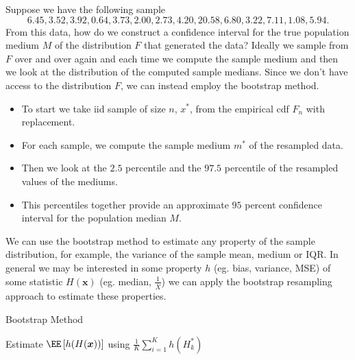 \begin{exam} \label{exam: bootstrap_median}
    Suppose we have the following sample
    \begin{equation*}
        6.45 , 3.52 , 3.92 , 0.64 , 3.73 , 2.00, 2.73 , 4.20, 20.58, 6.80, 3.22, 7.11, 1.08 , 5.94.
    \end{equation*}
    From this data, how do we construct a confidence interval for the true population medium $M$ of the distribution $F$ that generated the data? Ideally we sample from $F$ over and over again and each time we compute the sample medium and then we look at the distribution of the computed sample medians. Since we don't have access to the distribution $F$, we can instead employ the bootstrap method.
    \begin{itemize}
        \item To start we take iid sample of size $n$, $x^{\ast}$, from the empirical cdf $F_n$ with replacement.
        \item For each sample, we compute the sample medium $m^{\ast}$ of the resampled data.
        \item Then we look at the $2.5$ percentile and the $97.5$ percentile of the resampled values of the mediums.
        \item This percentiles together provide an approximate $95$ percent confidence interval for the population median $M$.
    \end{itemize}
\end{exam}

We can use the bootstrap method to estimate any property of the sample distribution, for example, the variance of the sample mean, medium or IQR. In general we may be interested in some property $h$ (eg. bias, variance, MSE) of some statistic $H(\bm{x})$ (eg. median, $\frac{1}{\overline{X}}$) we can apply the bootstrap resampling approach to estimate these properties.

    {\centering
        \begin{minipage}{.85\linewidth}
            \begin{algorithm}[H]
                \caption{Bootstrap Method}
                \label{alg: bootstrap}
                \SetAlgoLined
                \DontPrintSemicolon

                \BlankLine
                Estimate $\EE \left[ h(H(\bm{x})) \right]$ using $\frac{1}{K} \sum_{i=1}^{K} h(H_k^{\ast})$
                \BlankLine
            \end{algorithm}
        \end{minipage}
        \par
    }

